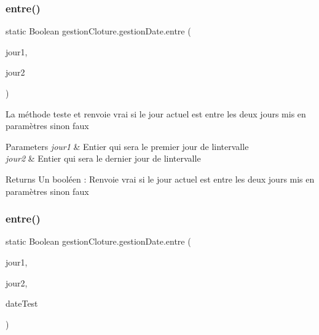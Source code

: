 \subsubsection{\texorpdfstring{entre()}{entre()}\hspace{0.1cm}{\footnotesize\ttfamily [1/2]}}
{\footnotesize\ttfamily static Boolean gestion\+Cloture.\+gestion\+Date.\+entre (\begin{DoxyParamCaption}\item[{int}]{jour1,  }\item[{int}]{jour2 }\end{DoxyParamCaption})\hspace{0.3cm}{\ttfamily [static]}}



La méthode teste et renvoie vrai si le jour actuel est entre les deux jours mis en paramètres sinon faux ~\newline



\begin{DoxyParams}{Parameters}
{\em jour1} & Entier qui sera le premier jour de l\textquotesingle{}intervalle\\
\hline
{\em jour2} & Entier qui sera le dernier jour de l\textquotesingle{}intervalle\\
\hline
\end{DoxyParams}
\begin{DoxyReturn}{Returns}
Un booléen \+: Renvoie vrai si le jour actuel est entre les deux jours mis en paramètres sinon faux
\end{DoxyReturn}
\mbox{\label{classgestion_cloture_1_1gestion_date_a8c1ca7bb5e1827fd1a120d6933f83d49}} 
\subsubsection{\texorpdfstring{entre()}{entre()}\hspace{0.1cm}{\footnotesize\ttfamily [2/2]}}
{\footnotesize\ttfamily static Boolean gestion\+Cloture.\+gestion\+Date.\+entre (\begin{DoxyParamCaption}\item[{int}]{jour1,  }\item[{int}]{jour2,  }\item[{Date\+Time}]{date\+Test }\end{DoxyParamCaption})\hspace{0.3cm}{\ttfamily [static]}}



